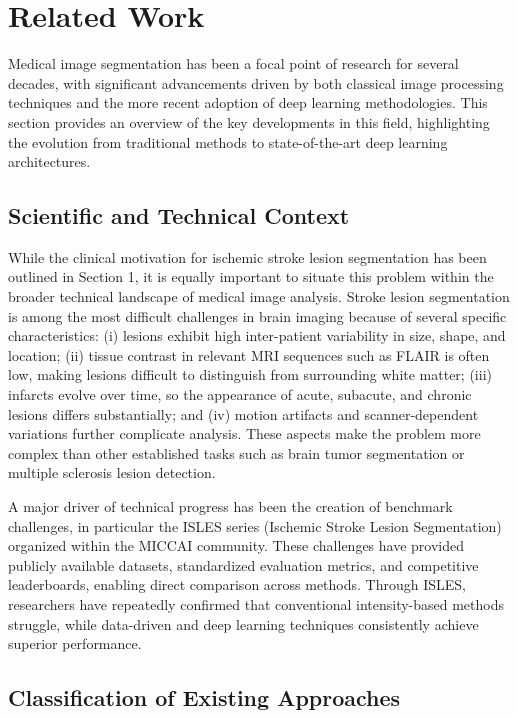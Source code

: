 \documentclass[12pt]{article}
\begin{document}
\section{Related Work} \label{sec:relatedwork}

Medical image segmentation has been a focal point of research for several decades, with significant advancements driven by both classical image processing techniques and the more recent adoption of deep learning methodologies. This section provides an overview of the key developments in this field, highlighting the evolution from traditional methods to state-of-the-art deep learning architectures.

\subsection{Scientific and Technical Context} \label{subsec:context}

While the clinical motivation for ischemic stroke lesion segmentation has been outlined in Section 1, it is equally important to situate this problem within the broader technical landscape of medical image analysis. Stroke lesion segmentation is among the most difficult challenges in brain imaging because of several specific characteristics: (i) lesions exhibit high inter-patient variability in size, shape, and location; (ii) tissue contrast in relevant MRI sequences such as FLAIR is often low, making lesions difficult to distinguish from surrounding white matter; (iii) infarcts evolve over time, so the appearance of acute, subacute, and chronic lesions differs substantially; and (iv) motion artifacts and scanner-dependent variations further complicate analysis. These aspects make the problem more complex than other established tasks such as brain tumor segmentation or multiple sclerosis lesion detection.

A major driver of technical progress has been the creation of benchmark challenges, in particular the ISLES series (Ischemic Stroke Lesion Segmentation) organized within the MICCAI community. These challenges have provided publicly available datasets, standardized evaluation metrics, and competitive leaderboards, enabling direct comparison across methods. Through ISLES, researchers have repeatedly confirmed that conventional intensity-based methods struggle, while data-driven and deep learning techniques consistently achieve superior performance. 

\subsection{Classification of Existing Approaches} \label{subsec:classification}
\end{document}
